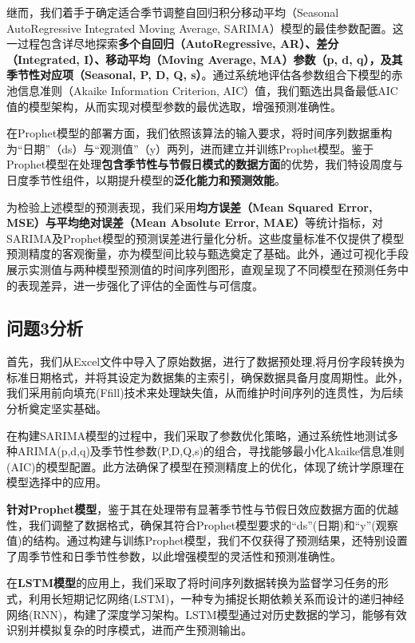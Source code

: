 \documentclass[a4paper]{article}
\begin{document}
继而，我们着手于确定适合季节调整自回归积分移动平均（Seasonal AutoRegressive Integrated Moving Average, SARIMA）模型的最佳参数配置。这一过程包含详尽地探索\textbf{多个自回归（AutoRegressive, AR）、差分（Integrated, I）、移动平均（Moving Average, MA）参数（p, d, q），及其季节性对应项（Seasonal, P, D, Q, s）}。通过系统地评估各参数组合下模型的赤池信息准则（Akaike Information Criterion, AIC）值，我们甄选出具备最低AIC值的模型架构，从而实现对模型参数的最优选取，增强预测准确性。

在Prophet模型的部署方面，我们依照该算法的输入要求，将时间序列数据重构为“日期”（ds）与“观测值”（y）两列，进而建立并训练Prophet模型。鉴于Prophet模型在处理\textbf{包含季节性与节假日模式的数据方面}的优势，我们特设周度与日度季节性组件，以期提升模型的\textbf{泛化能力和预测效能}。

为检验上述模型的预测表现，我们采用\textbf{均方误差（Mean Squared Error, MSE）与平均绝对误差（Mean Absolute Error, MAE）}等统计指标，对SARIMA及Prophet模型的预测误差进行量化分析。这些度量标准不仅提供了模型预测精度的客观衡量，亦为模型间比较与甄选奠定了基础。此外，通过可视化手段展示实测值与两种模型预测值的时间序列图形，直观呈现了不同模型在预测任务中的表现差异，进一步强化了评估的全面性与可信度。
	\subsection{问题3分析}
	
首先，我们从Excel文件中导入了原始数据，进行了数据预处理,将月份字段转换为标准日期格式，并将其设定为数据集的主索引，确保数据具备月度周期性。此外，我们采用前向填充(Ffill)技术来处理缺失值，从而维护时间序列的连贯性，为后续分析奠定坚实基础。

在构建SARIMA模型的过程中，我们采取了参数优化策略，通过系统性地测试多种ARIMA(p,d,q)及季节性参数(P,D,Q,s)的组合，寻找能够最小化Akaike信息准则(AIC)的模型配置。此方法确保了模型在预测精度上的优化，体现了统计学原理在模型选择中的应用。

\textbf{针对Prophet模型}，鉴于其在处理带有显著季节性与节假日效应数据方面的优越性，我们调整了数据格式，确保其符合Prophet模型要求的“ds”(日期)和“y”(观察值)的结构。通过构建与训练Prophet模型，我们不仅获得了预测结果，还特别设置了周季节性和日季节性参数，以此增强模型的灵活性和预测准确性。

在\textbf{LSTM模型}的应用上，我们采取了将时间序列数据转换为监督学习任务的形式，利用长短期记忆网络(LSTM)，一种专为捕捉长期依赖关系而设计的递归神经网络(RNN)，构建了深度学习架构。LSTM模型通过对历史数据的学习，能够有效识别并模拟复杂的时序模式，进而产生预测输出。
\end{document}
